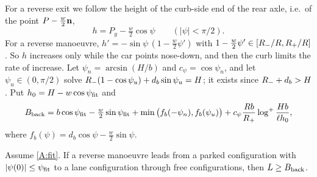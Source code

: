 For a reverse exit we follow the height of the curb-side end of the rear axle, i.e.\ of the point $P-\tfrac w2\mathbf{n}$,
\[
  h=P_y-\tfrac w2\cos\psi\qquad(|\psi|<\pi/2).
\]
For a reverse manoeuvre, $h'=-\sin\psi\,(1-\tfrac w2\psi')$ with $1-\tfrac w2\psi'\in[R_{-}/R,R_{+}/R]$.
So $h$ increases only while the car points nose-down, and then the curb limits the rate of increase.
Let $\psi_n=\arcsin(H/b)$ and $c_\psi=\cos\psi_n$, and let $\psi_u\in(0,\pi/2)$ solve $R_{-}(1-\cos\psi_u)+d_b\sin\psi_u=H$; it exists since $R_{-}+d_b>H$.
Put $h_0=H-w\cos\psi_{\rm fit}$ and
\begin{equation}\label{eq:Bback}
  B_{\rm back}=b\cos\psi_{\rm fit}-\tfrac w2\sin\psi_{\rm fit}+\min\big(f_b(-\psi_n),f_b(\psi_u)\big)+c_\psi\frac{Rb}{R_{+}}\log^+\frac{Hb}{\ell h_0},
\end{equation}
where $f_b(\psi)=d_b\cos\psi-\tfrac w2\sin\psi$.

\begin{proposition}\label{prop:one-reverse}
Assume \ref{A:fit}.
If a reverse manoeuvre leads from a parked configuration with $|\psi(0)|\le\psi_{\rm fit}$ to a lane configuration through free configurations, then $L\ge B_{\rm back}$.
\end{proposition}

